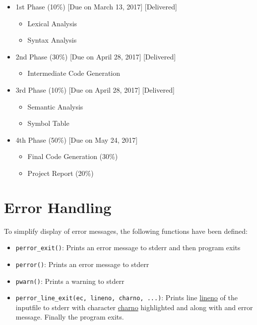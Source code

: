 \documentclass{article}
\def\code#1{\texttt{#1}} %
\begin{document}
\begin{itemize}
 \item 1st Phase (10\%) [Due on March 13, 2017] [Delivered]
 \begin{itemize}
  \item Lexical Analysis
  \item Syntax Analysis
 \end{itemize}

 \item 2nd Phase (30\%) [Due on April 28, 2017] [Delivered]
 \begin{itemize}
  \item Intermediate Code Generation
 \end{itemize}
 
 \item 3rd Phase (10\%) [Due on April 28, 2017] [Delivered]
 \begin{itemize}
  \item Semantic Analysis
  \item Symbol Table
 \end{itemize}

 \item 4th Phase (50\%) [Due on May 24, 2017]
 \begin{itemize}
  \item Final Code Generation (30\%)
  \item Project Report (20\%)
 \end{itemize}
\end{itemize}



\section{Error Handling}

To simplify display of error messages, the following functions have been defined:
\begin{itemize}
 \item \code{perror\_exit()}: Prints an error message to stderr and then program exits
 \item \code{perror()}: Prints an error message to stderr
 \item \code{pwarn()}: Prints a warning to stderr
 \item \code{perror\_line\_exit(ec, lineno, charno, ...)}: Prints line \underline{lineno}
       of the inputfile to stderr with character \underline{charno} highlighted and along
       with and error message. Finally the program exits.
\end{itemize}
\end{document}
